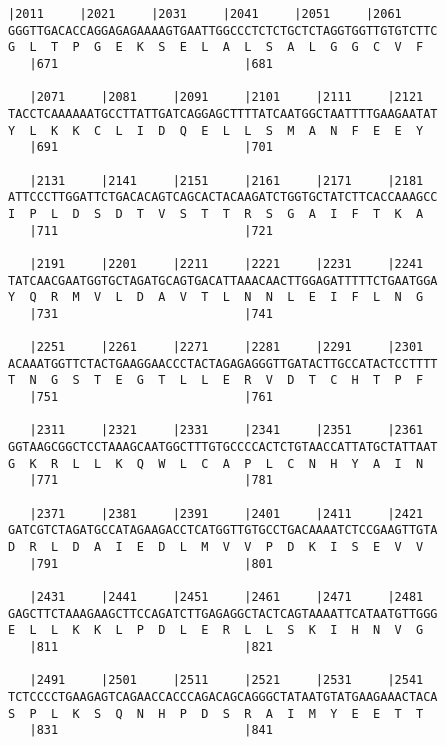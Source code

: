 \documentclass{article}
\begin{document}
\newpage
\begin{Verbatim}[fontfamily=courier]
   |2011     |2021     |2031     |2041     |2051     |2061  
GGGTTGACACCAGGAGAGAAAAGTGAATTGGCCCTCTCTGCTCTAGGTGGTTGTGTCTTC
G  L  T  P  G  E  K  S  E  L  A  L  S  A  L  G  G  C  V  F  
   |671                          |681                       

   |2071     |2081     |2091     |2101     |2111     |2121  
TACCTCAAAAAATGCCTTATTGATCAGGAGCTTTTATCAATGGCTAATTTTGAAGAATAT
Y  L  K  K  C  L  I  D  Q  E  L  L  S  M  A  N  F  E  E  Y  
   |691                          |701                       

   |2131     |2141     |2151     |2161     |2171     |2181  
ATTCCCTTGGATTCTGACACAGTCAGCACTACAAGATCTGGTGCTATCTTCACCAAAGCC
I  P  L  D  S  D  T  V  S  T  T  R  S  G  A  I  F  T  K  A  
   |711                          |721                       

   |2191     |2201     |2211     |2221     |2231     |2241  
TATCAACGAATGGTGCTAGATGCAGTGACATTAAACAACTTGGAGATTTTTCTGAATGGA
Y  Q  R  M  V  L  D  A  V  T  L  N  N  L  E  I  F  L  N  G  
   |731                          |741                       

   |2251     |2261     |2271     |2281     |2291     |2301  
ACAAATGGTTCTACTGAAGGAACCCTACTAGAGAGGGTTGATACTTGCCATACTCCTTTT
T  N  G  S  T  E  G  T  L  L  E  R  V  D  T  C  H  T  P  F  
   |751                          |761                       

   |2311     |2321     |2331     |2341     |2351     |2361  
GGTAAGCGGCTCCTAAAGCAATGGCTTTGTGCCCCACTCTGTAACCATTATGCTATTAAT
G  K  R  L  L  K  Q  W  L  C  A  P  L  C  N  H  Y  A  I  N  
   |771                          |781                       

   |2371     |2381     |2391     |2401     |2411     |2421  
GATCGTCTAGATGCCATAGAAGACCTCATGGTTGTGCCTGACAAAATCTCCGAAGTTGTA
D  R  L  D  A  I  E  D  L  M  V  V  P  D  K  I  S  E  V  V  
   |791                          |801                       

   |2431     |2441     |2451     |2461     |2471     |2481  
GAGCTTCTAAAGAAGCTTCCAGATCTTGAGAGGCTACTCAGTAAAATTCATAATGTTGGG
E  L  L  K  K  L  P  D  L  E  R  L  L  S  K  I  H  N  V  G  
   |811                          |821                       

   |2491     |2501     |2511     |2521     |2531     |2541  
TCTCCCCTGAAGAGTCAGAACCACCCAGACAGCAGGGCTATAATGTATGAAGAAACTACA
S  P  L  K  S  Q  N  H  P  D  S  R  A  I  M  Y  E  E  T  T  
   |831                          |841                       

\end{Verbatim}
\end{document}
